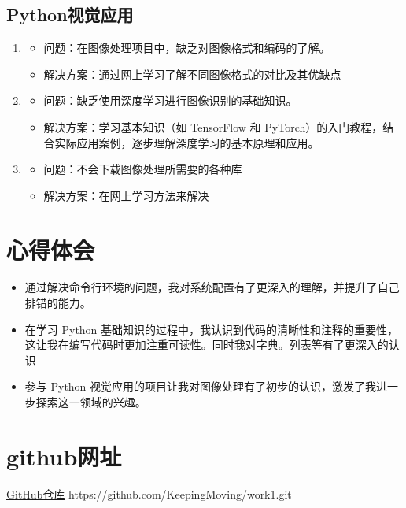 \documentclass[UTF8]{ctexart}
\begin{document}
\subsection{Python视觉应用}

\begin{enumerate} \item \begin{itemize} \item 问题：在图像处理项目中，缺乏对图像格式和编码的了解。 \item 解决方案：通过网上学习了解不同图像格式的对比及其优缺点 \end{itemize} \item \begin{itemize} \item 问题：缺乏使用深度学习进行图像识别的基础知识。 \item 解决方案：学习基本知识（如 TensorFlow 和 PyTorch）的入门教程，结合实际应用案例，逐步理解深度学习的基本原理和应用。 \end{itemize} \item \begin{itemize} \item 问题：不会下载图像处理所需要的各种库 \item 解决方案：在网上学习方法来解决 \end{itemize} \end{enumerate}

\section{心得体会} \begin{itemize} \item 通过解决命令行环境的问题，我对系统配置有了更深入的理解，并提升了自己排错的能力。 \item 在学习 Python 基础知识的过程中，我认识到代码的清晰性和注释的重要性，这让我在编写代码时更加注重可读性。同时我对字典。列表等有了更深入的认识 \item 参与 Python 视觉应用的项目让我对图像处理有了初步的认识，激发了我进一步探索这一领域的兴趣。\end{itemize}




  \section{github网址}
\href{https://github.com/KeepingMoving/work1.git}{GitHub仓库}
https://github.com/KeepingMoving/work1.git
 
\end{document}
